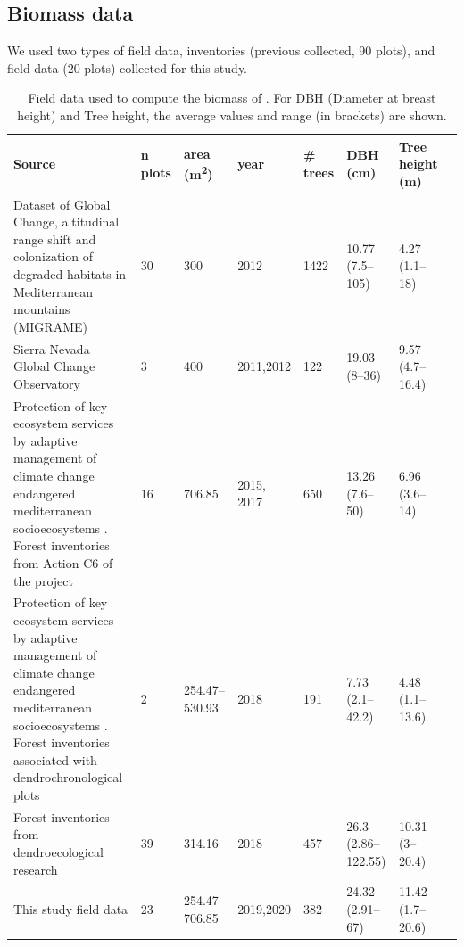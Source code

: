 \subsection{Biomass data}\label{sec:carbon:mat-field-data}

We used two types of field data, inventories (previous collected, 90 plots), and field data (20 plots) collected for this study. 

\begin{table} 
\caption{Field data used to compute the biomass of \Qp. For DBH (Diameter at breast height) and Tree height, the average values and range (in brackets) are shown.}\label{tab:carbon:inventories}
\begin{adjustbox}{width=\linewidth}
	\begin{threeparttable}
		\begin{tabular}{p{10cm}lllllll}
		\toprule[0.5pt]
		\textbf{Source} & \textbf{n plots} & \textbf{area (m\textsuperscript{2})} & \textbf{year} & \textbf{\# trees} & \textbf{DBH (cm)} & \textbf{Tree height (m)} \\ \toprule 
		Dataset of Global Change, altitudinal range shift and colonization of degraded habitats in Mediterranean mountains (MIGRAME) \autocite{PerezLuqueetal2015DatasetMIGRAME} & 30 & 300 & 2012 & 1422 & 10.77 (7.5--105) & 4.27 (1.1--18) \\ \midrule
		Sierra Nevada Global Change Observatory \autocites{Aspizuaetal2012EvaluacionGestion,Zamoraetal2017GlobalChange} & 3 & 400 & 2011,2012 & 122 & 19.03 (8--36) & 9.57 (4.7--16.4) \\ \midrule
		Protection of key ecosystem services by adaptive management of climate change endangered mediterranean socioecosystems \autocite{BareaAzconetal2017LIFEADAPTAMED}. Forest inventories from Action C6 of the project & 16 & 706.85 & 2015, 2017 & 650 & 13.26 (7.6--50) & 6.96 (3.6--14) \\ \midrule
		Protection of key ecosystem services by adaptive management of climate change endangered mediterranean socioecosystems \autocite{BareaAzconetal2017LIFEADAPTAMED}. Forest inventories associated with dendrochronological plots & 2 & 254.47--530.93 & 2018 & 191 & 7.73 (2.1--42.2) & 4.48 (1.1--13.6) \\ \midrule
		Forest inventories from dendroecological research \autocite[see chapter \ref{sec:dendro};][]{PerezLuqueetal2020LanduseLegacies} & 39 & 314.16 & 2018 & 457 & 26.3 (2.86--122.55) & 10.31 (3--20.4) \\ \midrule
		This study field data & 23 & 254.47--706.85 & 2019,2020 & 382 & 24.32 (2.91--67) & 11.42 (1.7--20.6) \\ \bottomrule
		\end{tabular}
	\end{threeparttable}
\end{adjustbox}
\end{table}

